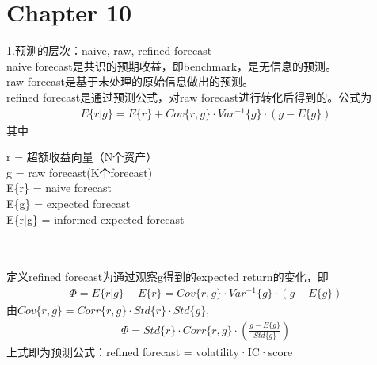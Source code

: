 \documentclass{article}
\begin{document}
\section{Chapter 10}
1.预测的层次：naive, raw, refined forecast\\
naive forecast是共识的预期收益，即benchmark，是无信息的预测。\\
raw forecast是基于未处理的原始信息做出的预测。\\
refined forecast是通过预测公式，对raw forecast进行转化后得到的。公式为
\begin{align}
    E\{r|g\} = E\{r\}+Cov\{r,g\}\cdot Var^{-1}\{g\}\cdot (g-E\{g\})
\end{align}
其中~~~~\begin{minipage}{0.7\linewidth}
    r = 超额收益向量（N个资产）\\
    g = raw forecast(K个forecast)\\
    E\{r\} = naive forecast\\
    E\{g\} = expected forecast\\
    E\{r|g\} = informed expected forecast
\end{minipage}\\
\\
定义refined forecast为通过观察g得到的expected return的变化，即
\begin{align}
\Phi = E\{r|g\} - E\{r\} = Cov\{r,g\}\cdot Var^{-1}\{g\}\cdot (g-E\{g\})
\end{align}
由$Cov\{r,g\} = Corr\{r,g\}\cdot Std\{r\}\cdot Std\{g\},$\\
\begin{align}
\Phi = Std\{r\}\cdot Corr\{r,g\}\cdot \left(\frac{g-E\{g\}}{Std\{g\}}\right)
\end{align}
上式即为预测公式：refined forecast = volatility·IC·score
\end{document}
